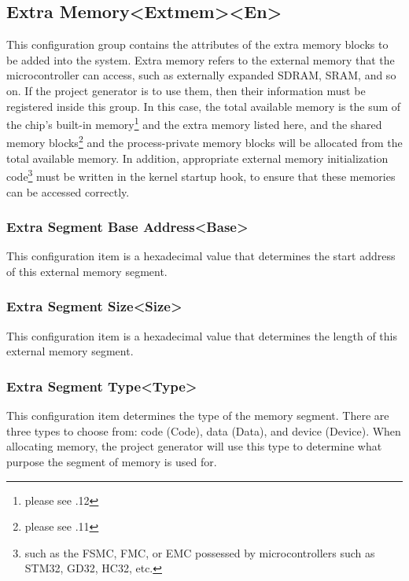 \subsection{Extra Memory<Extmem><En>{}}\label{subsec:5-3-10}

This configuration group contains the attributes of the extra memory blocks to be added into the system. Extra memory refers to the external memory that the microcontroller can access, such as externally expanded SDRAM, SRAM, and so on. If the project generator is to use them, then their information must be registered inside this group. In this case, the total available memory is the sum of the chip's built-in memory\footnote{please see .12} and the extra memory listed here, and the shared memory blocks\footnote{please see .11} and the process-private memory blocks will be allocated from the total available memory. In addition, appropriate external memory initialization code\footnote{such as the FSMC, FMC, or EMC possessed by microcontrollers such as STM32, GD32, HC32, etc.} must be written in the kernel startup hook, to ensure that these memories can be accessed correctly.

\subsubsection{Extra Segment Base Address<Base>{}}\label{subsubsec:5-3-10-1}

This configuration item is a hexadecimal value that determines the start address of this external memory segment.

\subsubsection{Extra Segment Size<Size>{}}\label{subsubsec:5-3-10-2}

This configuration item is a hexadecimal value that determines the length of this external memory segment.

\subsubsection{Extra Segment Type<Type>{}}\label{subsubsec:5-3-10-3}

This configuration item determines the type of the memory segment. There are three types to choose from: code (Code), data (Data), and device (Device). When allocating memory, the project generator will use this type to determine what purpose the segment of memory is used for.

